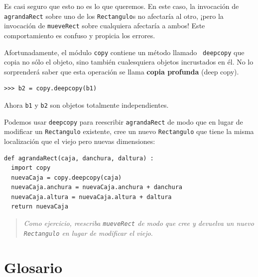 Es casi seguro que esto no es lo que queremos. En este caso, la invocación
de \texttt{agrandaRect} sobre uno de los \texttt{Rectangulo}s no afectaría al otro,
¡pero la invocación de \texttt{mueveRect} sobre cualquiera afectaría a ambos!
Este comportamiento es confuso y propicia los errores.

Afortunadamente, el módulo \texttt{copy} contiene un método llamado {\tt
deepcopy} que copia no sólo el objeto, sino también cualesquiera objetos
incrustados en él. No lo sorprenderá saber que esta operación se llama {\bf
copia profunda} (deep copy).

\beforeverb
\begin{verbatim}
>>> b2 = copy.deepcopy(b1)
\end{verbatim}
\afterverb
%
Ahora \texttt{b1} y \texttt{b2} son objetos totalmente independientes.

Podemos usar \texttt{deepcopy} para reescribir \texttt{agrandaRect} de modo que
en lugar de modificar un \texttt{Rectangulo} existente, cree un nuevo
\texttt{Rectangulo} que tiene la misma localización que el viejo pero nuevas
dimensiones:

\beforeverb
\begin{verbatim}
def agrandaRect(caja, danchura, daltura) :
  import copy
  nuevaCaja = copy.deepcopy(caja)
  nuevaCaja.anchura = nuevaCaja.anchura + danchura
  nuevaCaja.altura = nuevaCaja.altura + daltura
  return nuevaCaja
\end{verbatim}
\afterverb
%

\begin{quote}
{\em Como ejercicio, reescriba \texttt{mueveRect} de modo que cree y devuelva
un nuevo \texttt{Rectangulo} en lugar de modificar el viejo.}
\end{quote}


\section{Glosario}

